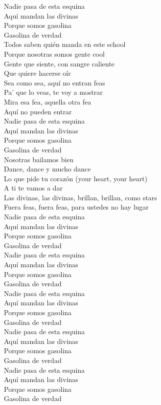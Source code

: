 Nadie pasa de esta esquina\\
Aquí mandan las divinas\\
Porque somos gasolina\\
Gasolina de verdad\\

Todos saben quién manda en este school\\
Porque nosotras somos gente cool\\
Gente que siente, con sangre caliente\\
Que quiere hacerse oír\\

Sea como sea, aquí no entran feas\\
Pa' que lo veas, te voy a mostrar\\
Mira esa fea, aquella otra fea\\
Aquí no pueden entrar\\

Nadie pasa de esta esquina\\
Aquí mandan las divinas\\
Porque somos gasolina\\
Gasolina de verdad\\

Nosotras bailamos bien\\
Dance, dance y mucho dance\\
Lo que pide tu corazón (your heart, your heart)\\
A ti te vamos a dar\\

Las divinas, las divinas, brillan, brillan, como stars\\
Fuera feas, fuera feas, para ustedes no hay lugar\\

Nadie pasa de esta esquina\\
Aquí mandan las divinas\\
Porque somos gasolina\\
Gasolina de verdad\\

Nadie pasa de esta esquina\\
Aquí mandan las divinas\\
Porque somos gasolina\\
Gasolina de verdad\\

Nadie pasa de esta esquina\\
Aquí mandan las divinas\\
Porque somos gasolina\\
Gasolina de verdad\\

Nadie pasa de esta esquina\\
Aquí mandan las divinas\\
Porque somos gasolina\\
Gasolina de verdad\\

Nadie pasa de esta esquina\\
Aquí mandan las divinas\\
Porque somos gasolina\\
Gasolina de verdad\\

